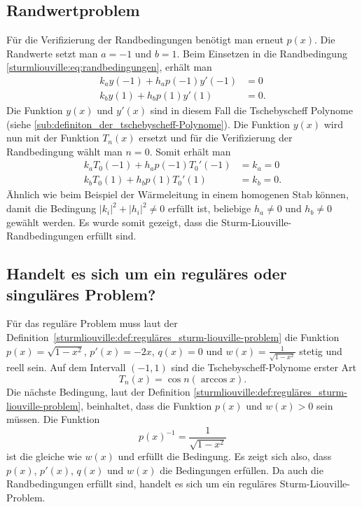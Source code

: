\subsection*{Randwertproblem}
Für die Verifizierung der Randbedingungen benötigt man erneut $p(x)$.
Die Randwerte setzt man $a = -1$ und $b = 1$.
Beim Einsetzen in die Randbedingung \eqref{sturmliouville:eq:randbedingungen},
erhält man
\begin{equation}
	\begin{aligned}
		k_a y(-1) + h_a p(-1) y'(-1) &= 0\\
		k_b y(1) + h_b p(1) y'(1) &= 0.
	\end{aligned} 
\end{equation}
Die Funktion $y(x)$ und $y'(x)$ sind in diesem Fall die Tschebyscheff Polynome
(siehe \ref{sub:definiton_der_tschebyscheff-Polynome}).
Die Funktion $y(x)$ wird nun mit der Funktion $T_n(x)$ ersetzt und für die
Verifizierung der Randbedingung wählt man $n=0$.
Somit erhält man
\begin{equation}
	\begin{aligned}
		k_a T_0(-1) + h_a p(-1) T_{0}'(-1) &= k_a = 0\\
		k_b T_0(1) + h_b p(1) T_{0}'(1) &= k_b = 0.
	\end{aligned}
\end{equation}
Ähnlich wie beim Beispiel der Wärmeleitung in einem homogenen Stab können,
damit die Bedingung $|k_i|^2 + |h_i|^2\ne 0$ erfüllt ist, beliebige
$h_a \ne 0$ und $h_b \ne 0$ gewählt werden.
Es wurde somit gezeigt, dass die Sturm-Liouville-Randbedingungen erfüllt sind.

\subsection*{Handelt es sich um ein reguläres oder singuläres Problem?}
Für das reguläre Problem muss laut der
Definition~\ref{sturmliouville:def:reguläres_sturm-liouville-problem} die Funktion
$p(x) = \sqrt{1-x^2}$, $p'(x) = -2x$, $q(x) = 0$ und
$w(x) = \frac{1}{\sqrt{1-x^2}}$ stetig und reell sein.
Auf dem Intervall $(-1,1)$ sind die Tschebyscheff-Polynome erster Art
\begin{equation}
	T_n(x)
	=
	\cos n (\arccos x).
\end{equation}
Die nächste Bedingung, laut der Definition \ref{sturmliouville:def:reguläres_sturm-liouville-problem}, beinhaltet, dass die Funktion $p(x)$ und $w(x)>0$ sein
müssen.
Die Funktion
\begin{equation*}
	p(x)^{-1} = \frac{1}{\sqrt{1-x^2}}
\end{equation*}
ist die gleiche wie $w(x)$ und erfüllt die Bedingung.
Es zeigt sich also, dass $p(x)$, $p'(x)$, $q(x)$ und $w(x)$
die Bedingungen erfüllen.
Da auch die Randbedingungen erfüllt sind, handelt es sich um ein reguläres Sturm-Liouville-Problem.



